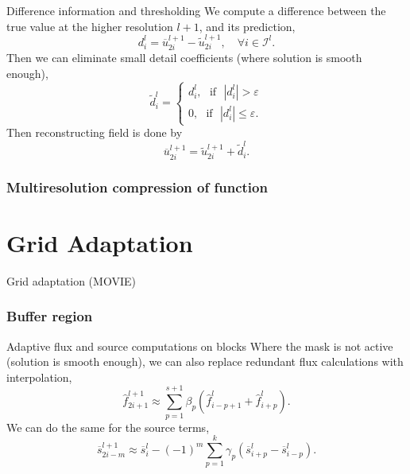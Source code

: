 \documentclass{beamer}
\begin{document}
\begin{frame}{Difference information and thresholding}
    We compute a difference between the true value at the higher resolution
    $l+1$, and its prediction,
    \begin{equation}
        d^{l}_{i} = \overline{u}^{l+1}_{2i} - \tilde{u}^{l+1}_{2i}, \quad \forall i \in \bm{\mathcal{I}}^{l}.
    \end{equation}
    Then we can eliminate small detail coefficients (where solution is smooth
    enough),
    \begin{equation}
        \tilde{d}^{l}_{i} =
            \begin{cases}
                d^{l}_{i}, \text{ } \text{if} \text{ } |d^{l}_{i}| > \varepsilon \\
                0, \text{ } \text{if} \text{ } |d^{l}_{i}| \leq
                \varepsilon.
            \end{cases}
    \end{equation}
    Then reconstructing field is done by
    \begin{equation*}
        \overline{u}^{l+1}_{2i} = \tilde{u}^{l+1}_{2i} + \tilde{d}^{l}_{i}.
    \end{equation*}
\end{frame}

\begin{frame}
    \frametitle{Multiresolution compression of function}
\end{frame}

\section{Grid Adaptation}

\begin{frame}{Grid adaptation}
    (MOVIE)
\end{frame}

\begin{frame}
    \frametitle{Buffer region}
\end{frame}

\begin{frame}{Adaptive flux and source computations on blocks}
    Where the mask is not active (solution is smooth enough), we can also
    replace redundant flux calculations with interpolation,
    \begin{equation}
        \hat{f}_{2i+1}^{l+1} \approx \sum_{p=1}^{s+1} \beta_{p} \left(
        \hat{f}^{l}_{i-p+1} + \hat{f}^{l}_{i+p} \right).
    \end{equation}
    We can do the same for the source terms,
    \begin{equation}
        \overline{s}_{2i-m}^{l+1} \approx \overline{s}_{i}^{l} - (-1)^{m} \sum_{p=1}^{k} \gamma_{p} \left(
            \overline{s}^{l}_{i+p} - \overline{s}^{l}_{i-p} \right).
    \end{equation}
\end{frame}
\end{document}
